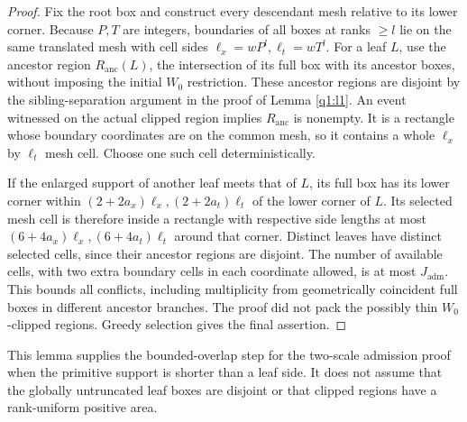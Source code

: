 \begin{proof}
Fix the root box and construct every descendant mesh relative to its lower corner. Because \(P,T\) are integers, boundaries of all boxes at ranks \(\ge l\) lie on the same translated mesh with cell sides \(\ell_{x}=w P^{l}, \ell_{t}=w T^{l}\). For a leaf \(L\), use the ancestor region \(R_{\mathrm{anc}}(L)\), the intersection of its full box with its ancestor boxes, without imposing the initial \(W_0\) restriction. These ancestor regions are disjoint by the sibling-separation argument in the proof of Lemma \ref{q1:l1}. An event witnessed on the actual clipped region implies \(R_{\mathrm{anc}}\) is nonempty. It is a rectangle whose boundary coordinates are on the common mesh, so it contains a whole \(\ell_{x}\) by \(\ell_{t}\) mesh cell. Choose one such cell deterministically.

If the enlarged support of another leaf meets that of \(L\), its full box has its lower corner within \((2+2a_{x})\ell_{x},(2+2a_{t})\ell_{t}\) of the lower corner of \(L\). Its selected mesh cell is therefore inside a rectangle with respective side lengths at most \((6+4a_{x})\ell_{x},(6+4a_{t})\ell_{t}\) around that corner. Distinct leaves have distinct selected cells, since their ancestor regions are disjoint. The number of available cells, with two extra boundary cells in each coordinate allowed, is at most \(J_{\mathrm{adm}}\). This bounds all conflicts, including multiplicity from geometrically coincident full boxes in different ancestor branches. The proof did not pack the possibly thin \(W_0\)-clipped regions. Greedy selection gives the final assertion. 
\end{proof}

This lemma supplies the bounded-overlap step for the two-scale admission proof when the primitive support is shorter than a leaf side. It does not assume that the globally untruncated leaf boxes are disjoint or that clipped regions have a rank-uniform positive area.



